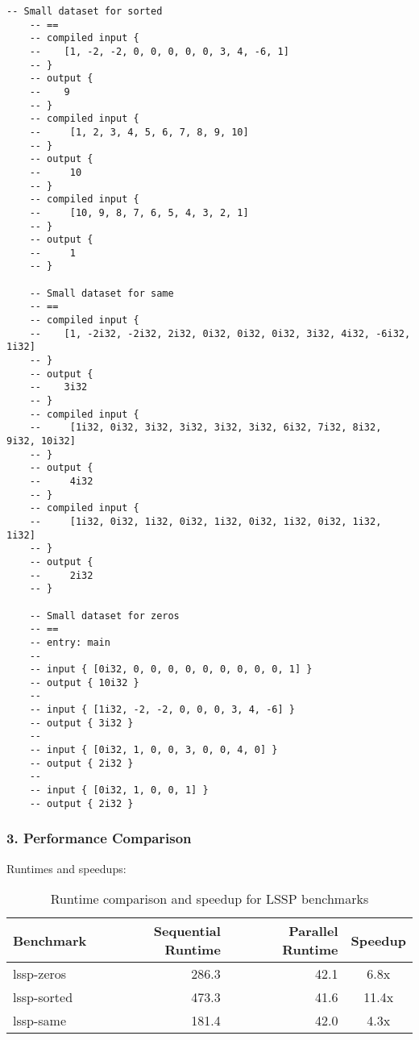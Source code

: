 \documentclass{article}
\begin{document}
    \begin{lstlisting}[language=Futhark]
    -- Small dataset for sorted
    -- ==
    -- compiled input {
    --    [1, -2, -2, 0, 0, 0, 0, 0, 3, 4, -6, 1]
    -- }  
    -- output { 
    --    9
    -- }
    -- compiled input {
    --     [1, 2, 3, 4, 5, 6, 7, 8, 9, 10]
    -- }
    -- output {
    --     10
    -- }
    -- compiled input {
    --     [10, 9, 8, 7, 6, 5, 4, 3, 2, 1]
    -- }
    -- output {
    --     1
    -- }

    -- Small dataset for same
    -- ==
    -- compiled input {
    --    [1, -2i32, -2i32, 2i32, 0i32, 0i32, 0i32, 3i32, 4i32, -6i32, 1i32]
    -- }
    -- output {
    --    3i32
    -- }
    -- compiled input {
    --     [1i32, 0i32, 3i32, 3i32, 3i32, 3i32, 6i32, 7i32, 8i32, 9i32, 10i32]
    -- }
    -- output {
    --     4i32
    -- }
    -- compiled input {
    --     [1i32, 0i32, 1i32, 0i32, 1i32, 0i32, 1i32, 0i32, 1i32, 1i32]
    -- }
    -- output {
    --     2i32
    -- }

    -- Small dataset for zeros
    -- ==
    -- entry: main
    -- 
    -- input { [0i32, 0, 0, 0, 0, 0, 0, 0, 0, 0, 1] }
    -- output { 10i32 }
    --
    -- input { [1i32, -2, -2, 0, 0, 0, 3, 4, -6] }
    -- output { 3i32 }
    --
    -- input { [0i32, 1, 0, 0, 3, 0, 0, 4, 0] }
    -- output { 2i32 }
    --
    -- input { [0i32, 1, 0, 0, 1] }
    -- output { 2i32 }
    \end{lstlisting}

    \subsubsection*{3. Performance Comparison}

    Runtimes and speedups:

    \begin{table}[h]
    \centering
    \begin{tabular}{|l|r|r|c|}
    \hline
    \textbf{Benchmark} & \textbf{Sequential Runtime} & \textbf{Parallel Runtime} & \textbf{Speedup} \\
    \hline
    lssp-zeros & 286.3 & 42.1 & 6.8x \\
    lssp-sorted & 473.3 & 41.6 & 11.4x \\
    lssp-same & 181.4 & 42.0 & 4.3x \\
    \hline
    \end{tabular}
    \caption{Runtime comparison and speedup for LSSP benchmarks}
    \label{tab:lssp-benchmarks}
    \end{table}
\end{document}
